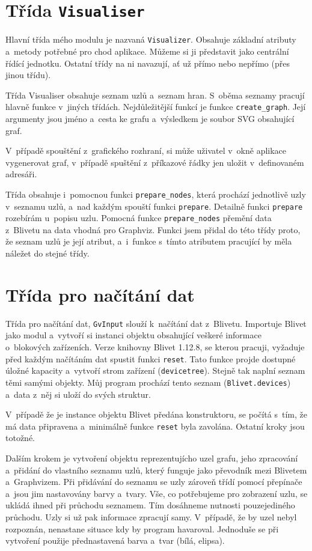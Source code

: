 \documentclass[color,table,oneside,nolot,nolof]{fithesis}
\begin{document}
\section{Třída \texttt{Visualiser}}
	Hlavní třída mého modulu je nazvaná \texttt{Visualizer}. Obsahuje základní atributy a~metody potřebné pro chod aplikace. Můžeme si ji představit jako centrální řídící jednotku. Ostatní
	třídy na ni navazují, ať už přímo nebo nepřímo (přes jinou třídu). 

	Třída Visualiser obsahuje seznam uzlů a~seznam hran. S~oběma seznamy pracují hlavně funkce v~jiných třídách. Nejdůležitější funkcí
	je funkce \texttt{create\_graph}. Její argumenty jsou jméno a~cesta ke grafu a~výsledkem je soubor SVG obsahující graf. 
	
	V~případě spouštění z~grafického rozhraní, si může uživatel v~okně aplikace vygenerovat graf, v~případě spuštění z~příkazové řádky jen uložit v~definovaném adresáři. 

	Třída obsahuje i~pomocnou funkci \texttt{prepare\_nodes}, která prochází jednotlivě uzly v~seznamu uzlů, a~nad každým spouští funkci \texttt{prepare}. Detailně funkci \texttt{prepare} rozebírám u~popisu uzlu.
	Pomocná funkce \texttt{prepare\_nodes}
	přemění data z~Blivetu na data vhodná pro Graphviz. Funkci jsem přidal do této třídy proto, že seznam uzlů je její atribut, a~i~funkce s~tímto atributem pracující by měla náležet do stejné třídy.

\section{Třída pro načítání dat}
	Třída pro načítání dat, \texttt{GvInput} slouží k~načítání dat z~Blivetu. Importuje Blivet jako modul a~vytvoří si instanci objektu obsahující veškeré informace
	o~blokových zařízeních. Verze knihovny Blivet 1.12.8, se kterou pracuji, vyžaduje před 
	každým načítáním dat spustit funkci \texttt{reset}. Tato funkce projde dostupné úložné kapacity a~vytvoří strom zařízení (\texttt{devicetree}). Stejně tak naplní seznam těmi
	samými objekty. Můj program prochází tento seznam (\texttt{Blivet.devices}) a~data z~něj si uloží do svých struktur. 
	
	V~případě že je instance objektu Blivet předána konstruktoru, se počítá s~tím, že má data připravena a~minimálně funkce \texttt{reset} byla zavolána.
	Ostatní kroky jsou totožné.

	Dalším krokem je vytvoření objektu reprezentujícho uzel grafu, jeho zpracování a~přidání do vlastního seznamu uzlů, který funguje jako převodník mezi Blivetem a~Graphvizem. Při
	přidávání do seznamu se uzly zároveň třídí pomocí přepínače a~jsou jim nastavovány barvy a~tvary. Vše, co potřebujeme pro zobrazení uzlu, se ukládá ihned při průchodu seznamem. 
	Tím dosáhneme nutnosti pouzejediného průchodu. Uzly si už pak informace zpracují samy. V~případě, že by uzel nebyl rozpoznán, nenastane situace kdy by program 
	havaroval. Jednoduše se při vytvoření použije přednastavená barva a~tvar (bílá, elipsa).
\end{document}
